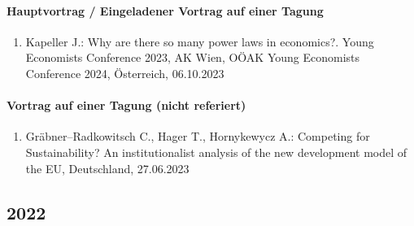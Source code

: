 \paragraph{Hauptvortrag / Eingeladener Vortrag auf einer Tagung}
\begin{enumerate}
	\item Kapeller J.: Why are there so many power laws in economics?. Young Economists Conference 2023, AK Wien, OÖAK Young Economists Conference 2024, Österreich, 06.10.2023
\end{enumerate}
\paragraph{Vortrag auf einer Tagung (nicht referiert)}
\begin{enumerate}
	\item Gräbner--Radkowitsch C., Hager T., Hornykewycz A.: Competing for Sustainability? An institutionalist analysis of the new development model of the EU, Deutschland, 27.06.2023
\end{enumerate}
\subsection*{2022}
